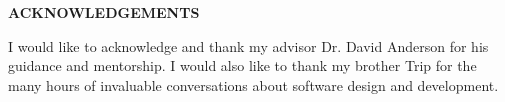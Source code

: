 \clearpage
\begin{centering}
\textbf{ACKNOWLEDGEMENTS}\\
\vspace{\baselineskip}
\end{centering}

I would like to acknowledge and thank my advisor Dr. David Anderson for his guidance and mentorship. I would also like to thank my brother Trip for the many hours of invaluable conversations about software design and development.  


\clearpage
